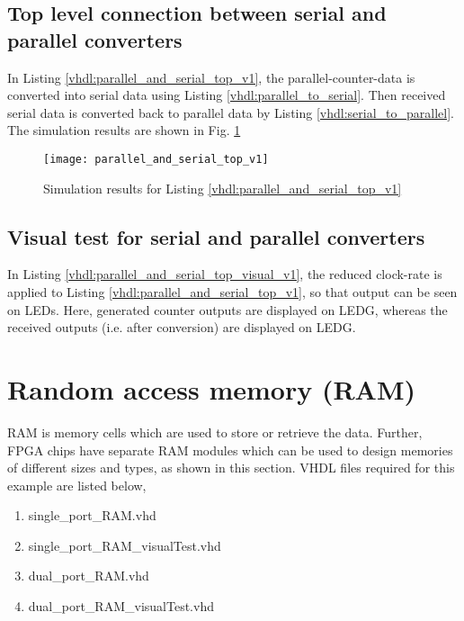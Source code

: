 \subsection{Top level connection between serial and parallel converters}
In Listing \ref{vhdl:parallel_and_serial_top_v1}, the parallel-counter-data is converted into serial data using Listing \ref{vhdl:parallel_to_serial}. Then received serial data is converted back to parallel data by Listing \ref{vhdl:serial_to_parallel}. The simulation results are shown in Fig. \ref{fig:parallel_and_serial_top_v1}



\begin{figure}[!h]
	\centering
	\texttt{[image: parallel\_and\_serial\_top\_v1]}
	\caption{Simulation results for Listing \ref{vhdl:parallel_and_serial_top_v1}}
	\label{fig:parallel_and_serial_top_v1}
\end{figure}

\subsection{Visual test for serial and parallel converters}
In Listing \ref{vhdl:parallel_and_serial_top_visual_v1}, the reduced clock-rate is applied to Listing \ref{vhdl:parallel_and_serial_top_v1}, so that output can be seen on LEDs. Here, generated counter outputs are displayed on LEDG, whereas the received outputs (i.e. after conversion) are displayed on LEDG. 



\section{Random access memory (RAM)}
RAM is memory cells which are used to store or retrieve the data. Further, FPGA chips have separate RAM modules which can be used to design memories of different sizes and types, as shown in this section. VHDL files required for this example are listed below, 
\begin{enumerate}
	\item single\_port\_RAM.vhd
	\item single\_port\_RAM\_visualTest.vhd
	\item dual\_port\_RAM.vhd
	\item dual\_port\_RAM\_visualTest.vhd
\end{enumerate}

